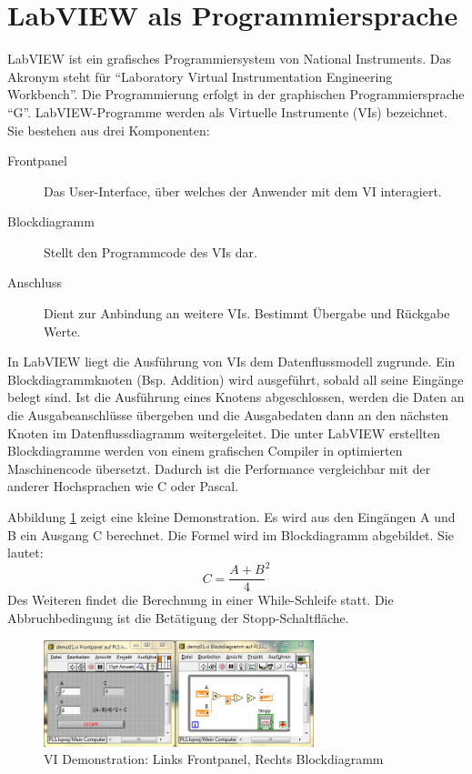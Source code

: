 \section{LabVIEW als Programmiersprache}
	\label{sec:labview}
	
LabVIEW ist ein grafisches Programmiersystem von National Instruments. Das Akronym steht für "`Laboratory Virtual Instrumentation Engineering Workbench"'.
Die Programmierung erfolgt in der graphischen Programmiersprache "`G"'.  LabVIEW-Programme werden als Virtuelle Instrumente (VIs) bezeichnet. \cite{ni-tuto} \cite{wiki-lv}
Sie bestehen aus drei Komponenten: 
\begin{description}
	\item[Frontpanel] Das User-Interface, über welches der Anwender mit dem VI interagiert.
	\item[Blockdiagramm] Stellt den Programmcode des VIs dar.
	\item[Anschluss] Dient zur Anbindung an weitere VIs. Bestimmt Übergabe und Rückgabe Werte. 
\end{description}

In LabVIEW liegt die Ausführung von VIs dem Datenflussmodell zugrunde. Ein Blockdiagrammknoten (Bsp. Addition) wird ausgeführt, sobald all seine Eingänge belegt sind. Ist die Ausführung eines Knotens abgeschlossen, werden die Daten an die Ausgabeanschlüsse übergeben und die Ausgabedaten dann an den nächsten Knoten im Datenflussdiagramm weitergeleitet. \cite{labview-buch01}
Die unter LabVIEW erstellten Blockdiagramme werden von einem grafischen Compiler in optimierten Maschinencode übersetzt. Dadurch ist die Performance vergleichbar mit der anderer Hochsprachen wie C oder Pascal. \cite{ni-compiler}

Abbildung \ref{fig:demo01} zeigt eine kleine Demonstration. Es wird aus den Eingängen A und B ein Ausgang C berechnet. Die Formel wird im Blockdiagramm abgebildet. Sie lautet:
\[ C = \frac{A+B}{4}^{2} \]
Des Weiteren findet die Berechnung in einer While-Schleife statt. Die Abbruchbedingung ist die Betätigung der Stopp-Schaltfläche. 

	\begin{figure}%
	\centering
		\includegraphics[width=0.7\textwidth]{Pics/demo01.png}
	\caption{VI Demonstration: Links Frontpanel, Rechts Blockdiagramm}
	\label{fig:demo01}
	\end{figure}

